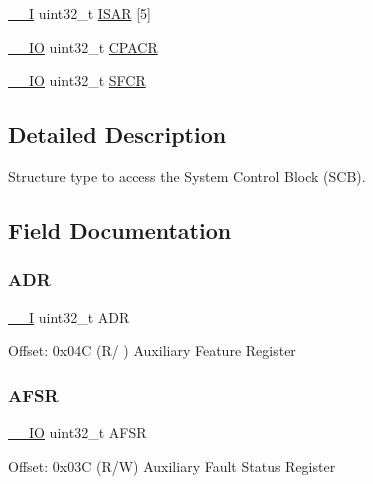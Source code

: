 \begin{DoxyCompactItemize}
\item 
\mbox{\hyperlink{core__sc300_8h_af63697ed9952cc71e1225efe205f6cd3}{\+\_\+\+\_\+I}} uint32\+\_\+t \mbox{\hyperlink{struct_s_c_b___type_abdeaebf965a4ca1dfde816cab85f1156}{I\+S\+AR}} \mbox{[}5\mbox{]}
\item 
\mbox{\hyperlink{core__sc300_8h_aec43007d9998a0a0e01faede4133d6be}{\+\_\+\+\_\+\+IO}} uint32\+\_\+t \mbox{\hyperlink{struct_s_c_b___type_acccaf5688449c8253e9952ddc2161528}{C\+P\+A\+CR}}
\item 
\mbox{\hyperlink{core__sc300_8h_aec43007d9998a0a0e01faede4133d6be}{\+\_\+\+\_\+\+IO}} uint32\+\_\+t \mbox{\hyperlink{struct_s_c_b___type_aa71bce1c6b3b85a1625a4bf040db7234}{S\+F\+CR}}
\end{DoxyCompactItemize}


\subsection{Detailed Description}
Structure type to access the System Control Block (S\+CB). 

\subsection{Field Documentation}
\mbox{\label{struct_s_c_b___type_a5c0e2e1c7195d4dc09a5ca077c596318}} 
\subsubsection{\texorpdfstring{ADR}{ADR}}
{\footnotesize\ttfamily \mbox{\hyperlink{core__sc300_8h_af63697ed9952cc71e1225efe205f6cd3}{\+\_\+\+\_\+I}} uint32\+\_\+t A\+DR}

Offset\+: 0x04C (R/ ) Auxiliary Feature Register \mbox{\label{struct_s_c_b___type_ab9176079ea223dd8902589da91af63a2}} 
\subsubsection{\texorpdfstring{AFSR}{AFSR}}
{\footnotesize\ttfamily \mbox{\hyperlink{core__sc300_8h_aec43007d9998a0a0e01faede4133d6be}{\+\_\+\+\_\+\+IO}} uint32\+\_\+t A\+F\+SR}

Offset\+: 0x03C (R/W) Auxiliary Fault Status Register \mbox{\label{struct_s_c_b___type_aaec159b48828355cb770049b8b2e8d91}} 
